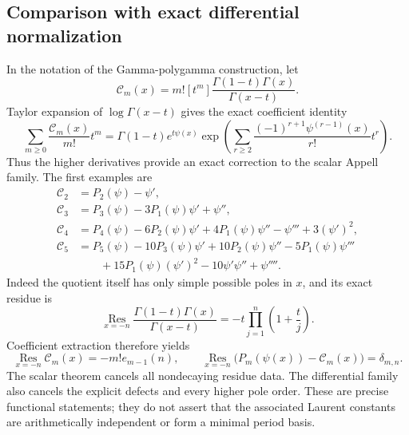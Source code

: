 \subsection{Comparison with exact differential normalization}

In the notation of the Gamma-polygamma construction, let
\begin{equation}
 \mathcal C_m(x)=m![t^m]\frac{\Gamma(1-t)\Gamma(x)}{\Gamma(x-t)}.
 \label{eq:scalar-differential-comparison-definition}
\end{equation}
Taylor expansion of $\log\Gamma(x-t)$ gives the exact
coefficient identity
\begin{equation}
 \sum_{m\geq0}\frac{\mathcal C_m(x)}{m!}t^m
 =\Gamma(1-t)e^{t\psi(x)}
  \exp\left(\sum_{r\geq2}
       \frac{(-1)^{r+1}\psi^{(r-1)}(x)}{r!}t^r\right).
 \label{eq:scalar-differential-comparison-generator}
\end{equation}
Thus the higher derivatives provide an exact correction to the
scalar Appell family.  The first examples are
\begin{equation}
 \begin{aligned}
 \mathcal C_2&=P_2(\psi)-\psi',\\
 \mathcal C_3&=P_3(\psi)-3P_1(\psi)\psi'+\psi'',\\
 \mathcal C_4&=P_4(\psi)-6P_2(\psi)\psi'+4P_1(\psi)\psi''
                  -\psi'''+3(\psi')^2,\\
 \mathcal C_5&=P_5(\psi)-10P_3(\psi)\psi'
                   +10P_2(\psi)\psi''-5P_1(\psi)\psi'''\\
 &\qquad+15P_1(\psi)(\psi')^2-10\psi'\psi''+\psi''''.
 \end{aligned}
 \label{eq:scalar-differential-comparison-examples}
\end{equation}
Indeed the quotient itself has only simple possible poles in $x$,
and its exact residue is
\begin{equation}
 \operatorname*{Res}_{x=-n}
    \frac{\Gamma(1-t)\Gamma(x)}{\Gamma(x-t)}
       =-t\prod_{j=1}^{n}\left(1+\frac{t}{j}\right).
 \label{eq:scalar-differential-exact-residue}
\end{equation}
Coefficient extraction therefore yields
\begin{equation}
 \operatorname*{Res}_{x=-n} \mathcal C_m(x)=-m!e_{m-1}(n),
 \qquad
 \operatorname*{Res}_{x=-n}\bigl(P_m(\psi(x))-\mathcal C_m(x)\bigr)
          =\delta_{m,n}.
 \label{eq:scalar-exact-defect-comparison}
\end{equation}
The scalar theorem cancels all nondecaying residue data.  The
differential family also cancels the explicit defects and every
higher pole order.  These are precise functional statements;
they do not assert that the associated Laurent constants are
arithmetically independent or form a minimal period basis.

